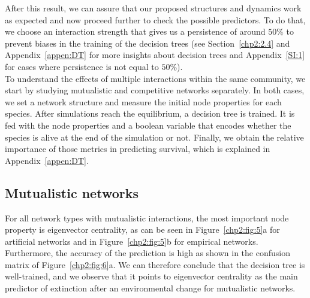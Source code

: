 After this result, we can assure that our proposed structures and dynamics work as expected and now proceed further to check the possible predictors. To do that, we choose an interaction strength that gives us a persistence of around $50\%$ to prevent biases in the training of the decision trees (see Section~\ref{chp2:2.4} and Appendix~\ref{appen:DT} for more insights about decision trees and  Appendix~\ref{SI:1} for cases where persistence is not equal to  $50\%$). \\

To understand the effects of multiple interactions within the same community, we start by studying mutualistic and competitive networks separately. In both cases, we set a network structure and measure the initial node properties for each species. After simulations reach the equilibrium, a decision tree is trained. It is fed with the node properties and a boolean variable that encodes whether the species is alive at the end of the simulation or not. Finally, we obtain the relative importance of those metrics in predicting survival, which is explained in Appendix~\ref{appen:DT}. \\

\subsection{Mutualistic networks}

For all network types with mutualistic interactions, the most important node property is eigenvector centrality, as can be seen in Figure~\ref{chp2:fig:5}a for artificial networks and in Figure~\ref{chp2:fig:5}b for empirical networks. Furthermore, the accuracy of the prediction is high as shown in the confusion matrix of Figure~\ref{chp2:fig:6}a. We can therefore conclude that the decision tree is well-trained, and we observe that it points to eigenvector centrality as the main predictor of extinction after an environmental change for mutualistic networks. \\

